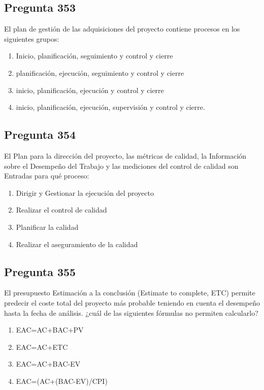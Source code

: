 \documentclass[11pt,a4paper]{article}
\begin{document}
\subsection*{Pregunta 353}
El plan de gestión de las adquisiciones del proyecto contiene procesos en los siguientes grupos:

\begin{enumerate}[label=\alph*)]
  \item Inicio, planificación, seguimiento y control y cierre
  \item planificación, ejecución, seguimiento y control y cierre
  \item inicio, planificación, ejecución y control y cierre
  \item inicio, planificación, ejecución, supervisión y control y cierre.
\end{enumerate}

\subsection*{Pregunta 354}
El Plan para la dirección del proyecto, las métricas de calidad, la Información sobre el Desempeño del Trabajo y las mediciones del control de calidad son Entradas para qué proceso:

\begin{enumerate}[label=\alph*)]
  \item Dirigir y Gestionar la ejecución del proyecto
  \item Realizar el control de calidad
  \item Planificar la calidad
  \item Realizar el aseguramiento de la calidad
\end{enumerate}

\subsection*{Pregunta 355}
El presupuesto Estimación a la conclusión (Estimate to complete, ETC) permite predecir el coste total del proyecto más probable teniendo en cuenta el desempeño hasta la fecha de análisis. ¿cuál de las siguientes fórmulas no permiten calcularlo?

\begin{enumerate}[label=\alph*)]
  \item EAC=AC+BAC+PV
  \item EAC=AC+ETC
  \item EAC=AC+BAC-EV
  \item EAC=(AC+(BAC-EV)/CPI)
\end{enumerate}
\end{document}

